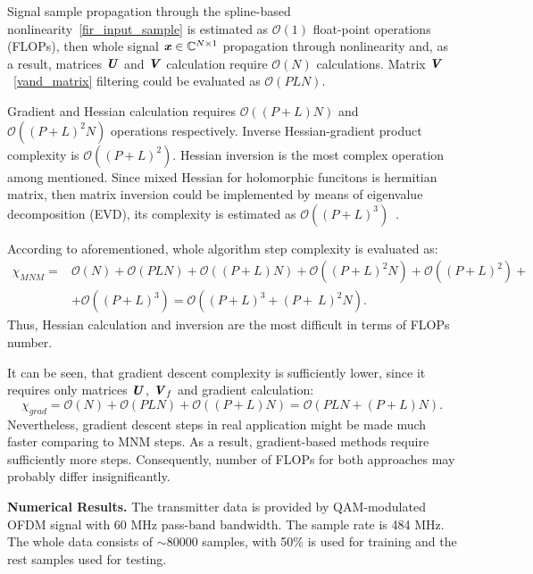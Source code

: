 \documentclass[12pt]{article}
\newcommand{\bit}[1]{\ensuremath{\textbf{\textit{#1}}}}
\begin{document}
Signal sample propagation through the spline-based nonlinearity~\eqref{fir_input_sample} is estimated as $\mathcal{O}(1)$ float-point operations (FLOPs), then whole signal $\bit{x}\in\mathbb{C}^{N\times 1}$ propagation through nonlinearity and, as a result, matrices $\bit{U}$ and $\bit{V}$ calculation require $\mathcal{O}(N)$ calculations. Matrix $\bit{V}$~\eqref{vand_matrix} filtering could be evaluated as $\mathcal{O}(PLN)$. 

Gradient and Hessian calculation requires $\mathcal{O}((P+L)N)$ and $\mathcal{O}((P+L)^2N)$ operations respectively. Inverse Hessian-gradient product complexity is $\mathcal{O}((P+L)^2)$. Hessian inversion is the most complex operation among mentioned. Since mixed Hessian for holomorphic funcitons is hermitian matrix, then matrix inversion could be implemented by means of eigenvalue decomposition (EVD), its complexity is estimated as $\mathcal{O}((P+L)^3)$~\cite{matrix_comput}.

According to aforementioned, whole algorithm step complexity is evaluated as:
\begin{align}
    \chi_{MNM}=&\mathcal{O}(N)+\mathcal{O}(PLN)+\mathcal{O}((P+L)N)+\mathcal{O}((P+L)^2N)+\mathcal{O}((P+L)^2)+ \nonumber \\
    &+\mathcal{O}((P+L)^3)=\mathcal{O}((P+L)^3+(P+~L)^2N).
    \label{complexity_mnm}
\end{align}
Thus, Hessian calculation and inversion are the most difficult in terms of FLOPs number.

It can be seen, that gradient descent complexity is sufficiently lower, since it requires only matrices $\bit{U}$, $\bit{V}_f$ and gradient calculation:
\begin{equation}
    \chi_{grad}=\mathcal{O}(N)+\mathcal{O}(PLN)+\mathcal{O}((P+L)N)=\mathcal{O}(PLN+(P+L)N).
    \label{complexity_grad}
\end{equation}
Nevertheless, gradient descent steps in real application might be made much faster comparing to MNM steps. As a result, gradient-based methods require sufficiently more steps. Consequently, number of FLOPs for both approaches may probably differ insignificantly.

\textbf{Numerical Results.} The transmitter data is provided by QAM-modulated OFDM signal with 60 MHz pass-band bandwidth. The sample rate is 484 MHz. The whole data consists of $\sim$80000 samples, with 50\% is used for training and the rest samples used for testing. 
\end{document}
